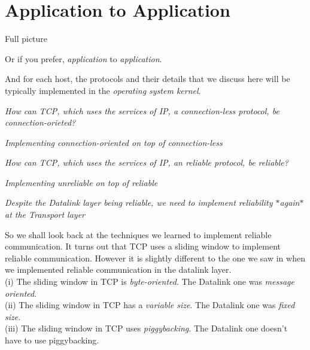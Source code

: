 \section{Application to Application}

Full picture

Or if you prefer, \textit{application} to \textit{application}. 


And for each host, the protocols and their details that we discuss here will 
be typically implemented in the \textit{operating system kernel}. 








\frmrule

\textit{How can TCP, which uses the services of IP, a connection-less protocol, be connection-orieted?}

\frmrule 

\textit{Implementing connection-oriented on top of connection-less}


\frmrule

\textit{How can TCP, which uses the services of IP, an reliable protocol, be reliable?}

\frmrule 

\textit{Implementing unreliable on top of reliable}




\frmrule

\textit{Despite the Datalink layer being reliable, we need to implement reliability $*$again$*$ at the Transport layer}



So we shall look back at the techniques we learned to implement reliable communication. 
It turns out that TCP uses a sliding window to implement reliable communication. 
However it is slightly different to the one we saw in when we implemented reliable 
communication in the datalink layer. \\
(i) The sliding window in TCP is \textit{byte-oriented}. The Datalink one was \textit{message oriented}. \\
(ii) The sliding window in TCP has a \textit{variable size}. The Datalink one was \textit{fixed size}.\\
(iii) The sliding window in TCP uses \textit{piggybacking}. The Datalink one doesn't have to use piggybacking. 

